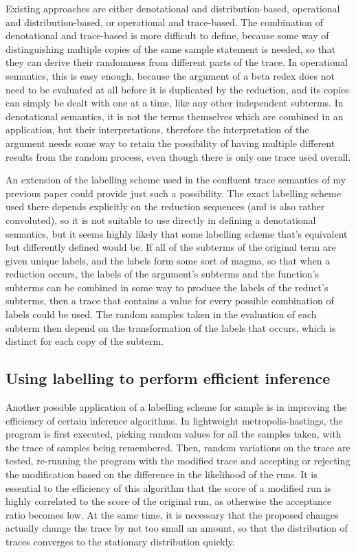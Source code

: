 \documentclass[titlepage]{article}
\begin{document}
Existing approaches are either denotational and distribution-based, operational and distribution-based, or operational and trace-based. The combination of denotational and trace-based is more difficult to define, because some way of distinguishing multiple copies of the same sample statement is needed, so that they can derive their randomness from different parts of the trace. In operational semantics, this is easy enough, because the argument of a beta redex does not need to be evaluated at all before it is duplicated by the reduction, and its copies can simply be dealt with one at a time, like any other independent subterms. In denotational semantics, it is not the terms themselves which are combined in an application, but their interpretations, therefore the interpretation of the argument needs some way to retain the possibility of having multiple different results from the random process, even though there is only one trace used overall.

An extension of the labelling scheme used in the confluent trace semantics of my previous paper could provide just such a possibility. The exact labelling scheme used there depends explicitly on the reduction sequences (and is also rather convoluted), so it is not suitable to use directly in defining a denotational semantics, but it seems highly likely that some labelling scheme that's equivalent but differently defined would be. If all of the subterms of the original term are given unique labels, and the labels form some sort of magma, so that when a reduction occurs, the labels of the argument's subterms and the function's subterms can be combined in some way to produce the labels of the reduct's subterms, then a trace that contains a value for every possible combination of labels could be used. The random samples taken in the evaluation of each subterm then depend on the transformation of the labels that occurs, which is distinct for each copy of the subterm.

\subsection{Using labelling to perform efficient inference}
Another possible application of a labelling scheme for sample is in improving the efficiency of certain inference algorithms. In lightweight metropolis-hastings, the program is first executed, picking random values for all the samples taken, with the trace of samples being remembered. Then, random variations on the trace are tested, re-running the program with the modified trace and accepting or rejecting the modification based on the difference in the likelihood of the runs. It is essential to the efficiency of this algorithm that the score of a modified run is highly correlated to the score of the original run, as otherwise the acceptance ratio becomes low. At the same time, it is necessary that the proposed changes actually change the trace by not too small an amount, so that the distribution of traces converges to the stationary distribution quickly.
\end{document}
